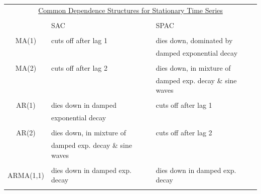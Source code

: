 \documentclass[12pt]{../notes}
\begin{document}
\begin{enumerate}[leftmargin=*]
\begin{itemize}
\end{itemize}

\vspace{1em}


\begin{tabular}{c l l}
\multicolumn{3}{c}{\underline{Common Dependence Structures for Stationary Time Series}} \\
& & \\
  & SAC & SPAC \\ \hline
 & \\
MA(1) & cuts off after lag 1 & dies down, dominated by\\
  & & damped exponential decay \\
 & \\
MA(2) & cuts off after lag 2 & dies down, in mixture of\\
  & & damped exp. decay \& sine waves \\
 & \\
AR(1) & dies down in damped & cuts off after lag 1\\
  & exponential decay & \\
 & \\
AR(2) & dies down, in mixture of & cuts off after lag 2\\
 & damped exp. decay \& sine waves & \\
 & \\
ARMA(1,1) & dies down in damped exp. decay & dies down in damped exp. decay\\
 & \\ \hline
\end{tabular}

\vspace{3em}


\end{enumerate}
\end{document}
